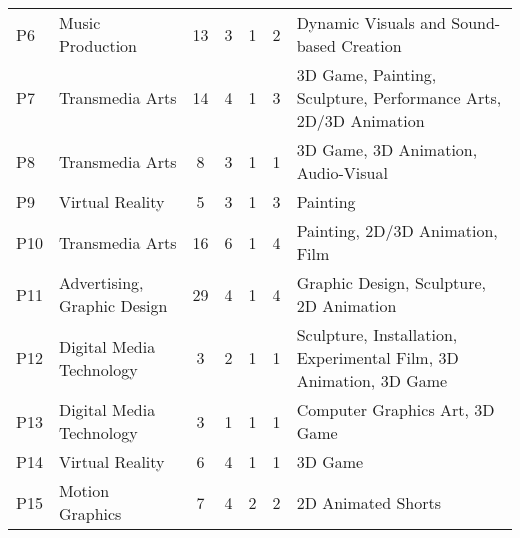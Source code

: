 \begin{table*}[t]
{\begin{tabular}{llccccl}
P6          & Music Production                   & 13                             & 3           & 1                          & 2              & Dynamic Visuals and Sound-based Creation                                               \\
P7          & Transmedia Arts                    & 14                             & 4           & 1                          & 3              & 3D Game, Painting, Sculpture, Performance Arts, 2D/3D Animation          \\
P8          & Transmedia Arts                    & 8                              & 3           & 1                          & 1              & 3D Game, 3D Animation, Audio-Visual                                                        \\
P9          & Virtual Reality                    & 5                              & 3           & 1                          & 3              & Painting                                                                                \\
P10         & Transmedia Arts                    & 16                             & 6           & 1                          & 4              & Painting, 2D/3D Animation, Film                                                          \\
P11         & Advertising, Graphic Design        & 29                             & 4           & 1                          & 4              & Graphic Design, Sculpture, 2D Animation \\
P12         & Digital Media Technology           & 3                              & 2           & 1                          & 1              & Sculpture, Installation, Experimental Film, 3D Animation, 3D Game                     \\
P13         & Digital Media Technology           & 3                              & 1           & 1                          & 1              & Computer Graphics Art, 3D Game                                                                         \\
P14         & Virtual Reality                    & 6                              & 4           & 1                          & 1              & 3D Game                                                                                 \\
P15         & Motion Graphics                    & 7                              & 4           & 2                          & 2              & 2D Animated Shorts                                                                      \\

\end{tabular}}
\end{table*}

